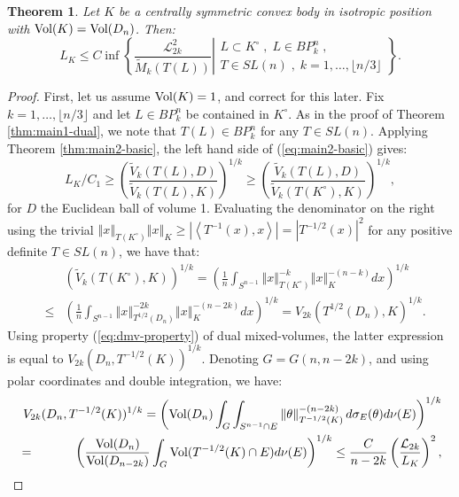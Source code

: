 \documentclass[12pt,oneside]{amsart}
\newtheorem{thm}{Theorem}[section] %
\theoremstyle{definition}
\theoremstyle{remark}
\theoremstyle{proof}
\numberwithin{equation}{section}
\newcommand{\norm}[1]{\left\Vert#1\right\Vert}
\newcommand{\abs}[1]{\left\vert#1\right\vert}
\newcommand{\set}[1]{\left\{#1\right\}}
\newcommand{\brac}[1]{\left(#1\right)}
\newcommand{\scalar}[1]{\left \langle #1 \right \rangle}
\newcommand{\BP}{BP}
\renewcommand{\MR}{\widetilde{M}} %
\renewcommand{\L}{\mathcal{L}}
\newcommand{\Vol}[1]{\textnormal{Vol} (#1)}
\begin{document}
\begin{thm} \label{thm:main2-dual}
Let $K$ be a centrally symmetric convex body in isotropic
position with $\Vol{K}=\Vol{D_n}$. Then:
\[
L_K \leq C \inf \set{\left . \frac{\L_{2k}^2}{\MR_k(T(L))}  \right
|
\begin{array}{c} L \subset K^\circ \; , \; L \in \BP_k^n \; , \\ T \in SL(n) \; , \; k =
1,\ldots,\lfloor n/3 \rfloor \end{array} }.
\]
\end{thm}
\begin{proof}
First, let us assume $\Vol{K}=1$, and correct for this later. Fix
$k=1,\ldots,\lfloor n/3 \rfloor$ and let $L \in \BP_k^n$ be
contained in $K^\circ$. As in the proof of Theorem
\ref{thm:main1-dual}, we note that $T(L) \in \BP_k^n$ for any $T
\in SL(n)$. Applying Theorem \ref{thm:main2-basic}, the left hand
side of (\ref{eq:main2-basic}) gives:
\begin{equation} \label{eq:main2-polar}
L_K  / C_1 \geq \brac{ \frac{ \widetilde{V}_k(T(L),D) }
{\widetilde{V}_k(T(L),K)}}^{1/k} \geq \brac{ \frac{
\widetilde{V}_k(T(L),D) } {\widetilde{V}_k(T(K^\circ),K)}}^{1/k},
\end{equation}
for $D$ the Euclidean ball of volume 1. Evaluating the denominator
on the right using the trivial $\norm{x}_{T(K^\circ)} \norm{x}_K
\geq \abs{\scalar{T^{-1}(x),x}} = \abs{T^{-1/2}(x)}^2$ for any
positive definite $T\in SL(n)$, we have that:
\begin{eqnarray}
\nonumber & & \brac{ \widetilde{V}_k(T(K^\circ),K) }^{1/k} =
\brac{\frac{1}{n} \int_{S^{n-1}} \norm{x}^{-k}_{T(K^\circ)}
\norm{x}_K^{-(n-k)} dx}^{1/k} \\
\nonumber & \leq & \brac{\frac{1}{n} \int_{S^{n-1}}
\norm{x}_{T^{1/2}(D_n)}^{-2k} \norm{x}_K^{-(n-2k)}dx}^{1/k} =
V_{2k}(T^{1/2}(D_n),K)^{1/k}.
\end{eqnarray}
Using property (\ref{eq:dmv-property}) of dual mixed-volumes, the
latter expression is equal to $V_{2k}(D_n,T^{-1/2}(K))^{1/k}$.
Denoting $G = G(n,n-2k)$, and using polar coordinates and double
integration, we have:
\begin{eqnarray}
\nonumber & & \!\!\!\!\!\!\!\!\!\! V_{2k}(D_n,T^{-1/2}(K))^{1/k} =
\brac{ \Vol{D_n} \int_{G} \int_{S^{n-1}\cap E} \norm{\theta}_{T^{-1/2}(K)}^{-(n-2k)} d\sigma_E(\theta) d\nu(E) }^{1/k} \\
\nonumber & = & \brac{ \frac{\Vol{D_n}}{\Vol{D_{n-2k}}} \int_{G}
\Vol{T^{-1/2}(K) \cap E} d\nu(E) }^{1/k}  \leq
\frac{C}{n-2k}\brac{\frac{\L_{2k}}{L_K}}^2,

\end{eqnarray}
\end{proof}
\end{document}
